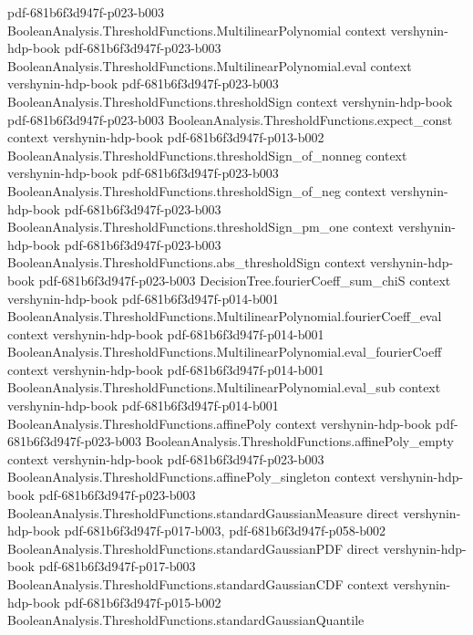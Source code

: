 \begin{theorem}
  {pdf-681b6f3d947f-p023-b003}
\proofstep
  {BooleanAnalysis.ThresholdFunctions.MultilinearPolynomial}
  {context}
  {vershynin-hdp-book}
  {pdf-681b6f3d947f-p023-b003}
\proofstep
  {BooleanAnalysis.ThresholdFunctions.MultilinearPolynomial.eval}
  {context}
  {vershynin-hdp-book}
  {pdf-681b6f3d947f-p023-b003}
\proofstep
  {BooleanAnalysis.ThresholdFunctions.thresholdSign}
  {context}
  {vershynin-hdp-book}
  {pdf-681b6f3d947f-p023-b003}
\proofstep
  {BooleanAnalysis.ThresholdFunctions.expect_const}
  {context}
  {vershynin-hdp-book}
  {pdf-681b6f3d947f-p013-b002}
\proofstep
  {BooleanAnalysis.ThresholdFunctions.thresholdSign_of_nonneg}
  {context}
  {vershynin-hdp-book}
  {pdf-681b6f3d947f-p023-b003}
\proofstep
  {BooleanAnalysis.ThresholdFunctions.thresholdSign_of_neg}
  {context}
  {vershynin-hdp-book}
  {pdf-681b6f3d947f-p023-b003}
\proofstep
  {BooleanAnalysis.ThresholdFunctions.thresholdSign_pm_one}
  {context}
  {vershynin-hdp-book}
  {pdf-681b6f3d947f-p023-b003}
\proofstep
  {BooleanAnalysis.ThresholdFunctions.abs_thresholdSign}
  {context}
  {vershynin-hdp-book}
  {pdf-681b6f3d947f-p023-b003}
\proofstep
  {DecisionTree.fourierCoeff_sum_chiS}
  {context}
  {vershynin-hdp-book}
  {pdf-681b6f3d947f-p014-b001}
\proofstep
  {BooleanAnalysis.ThresholdFunctions.MultilinearPolynomial.fourierCoeff_eval}
  {context}
  {vershynin-hdp-book}
  {pdf-681b6f3d947f-p014-b001}
\proofstep
  {BooleanAnalysis.ThresholdFunctions.MultilinearPolynomial.eval_fourierCoeff}
  {context}
  {vershynin-hdp-book}
  {pdf-681b6f3d947f-p014-b001}
\proofstep
  {BooleanAnalysis.ThresholdFunctions.MultilinearPolynomial.eval_sub}
  {context}
  {vershynin-hdp-book}
  {pdf-681b6f3d947f-p014-b001}
\proofstep
  {BooleanAnalysis.ThresholdFunctions.affinePoly}
  {context}
  {vershynin-hdp-book}
  {pdf-681b6f3d947f-p023-b003}
\proofstep
  {BooleanAnalysis.ThresholdFunctions.affinePoly_empty}
  {context}
  {vershynin-hdp-book}
  {pdf-681b6f3d947f-p023-b003}
\proofstep
  {BooleanAnalysis.ThresholdFunctions.affinePoly_singleton}
  {context}
  {vershynin-hdp-book}
  {pdf-681b6f3d947f-p023-b003}
\proofstep
  {BooleanAnalysis.ThresholdFunctions.standardGaussianMeasure}
  {direct}
  {vershynin-hdp-book}
  {pdf-681b6f3d947f-p017-b003,
    pdf-681b6f3d947f-p058-b002}
\proofstep
  {BooleanAnalysis.ThresholdFunctions.standardGaussianPDF}
  {direct}
  {vershynin-hdp-book}
  {pdf-681b6f3d947f-p017-b003}
\proofstep
  {BooleanAnalysis.ThresholdFunctions.standardGaussianCDF}
  {context}
  {vershynin-hdp-book}
  {pdf-681b6f3d947f-p015-b002}
\proofstep
  {BooleanAnalysis.ThresholdFunctions.standardGaussianQuantile}

\end{theorem}
